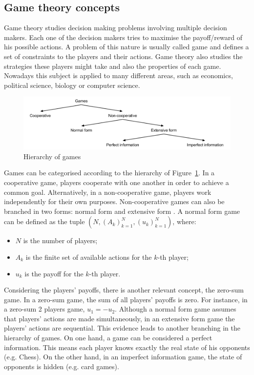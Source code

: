 \subsection{Game theory concepts}

Game theory studies decision making problems involving multiple decision makers.
Each one of the decision makers tries to maximise the payoff/reward of his possible actions.
A problem of this nature is usually called game and defines a set of constraints to the players and their actions.
Game theory also studies the strategies these players might take and also the properties of each game.
Nowadays this subject is applied to many different areas, such as economics, political science, biology or computer science.

\begin{figure}
\centering
\includegraphics[width=1\textwidth]{./img/gamesHierarchy}
\caption{Hierarchy of games}
\label{fig:games}
\end{figure}

Games can be categorised according to the hierarchy of Figure~\ref{fig:games}.
In a cooperative game, players cooperate with one another in order to achieve a common goal.
Alternatively, in a non-cooperative game, players work independently for their own purposes.
Non-cooperative games can also be branched in two forms: normal form and extensive form \cite{Shoham2010}.
A normal form game can be defined as the tuple $(N,(A_k)_{k=1}^{N},(u_k)_{k=1}^{N})$, where:
\begin{itemize}
\item $N$ is the number of players;
\item $A_k$ is the finite set of available actions for the $k$-th player;
\item $u_k$ is the payoff for the $k$-th player.
\end{itemize}
Considering the players' payoffs, there is another relevant concept, the zero-sum game.
In a zero-sum game, the sum of all players' payoffs is zero.
For instance, in a zero-sum 2 players game, $u_1 = -u_2$.
Although a normal form game assumes that players' actions are made simultaneously, in an extensive form game the players' actions are sequential.
This evidence leads to another branching in the hierarchy of games.
On one hand, a game can be considered a perfect information.
This means each player knows exactly the real state of his opponents (e.g. Chess).
On the other hand, in an imperfect information game, the state of opponents is hidden (e.g. card games).

